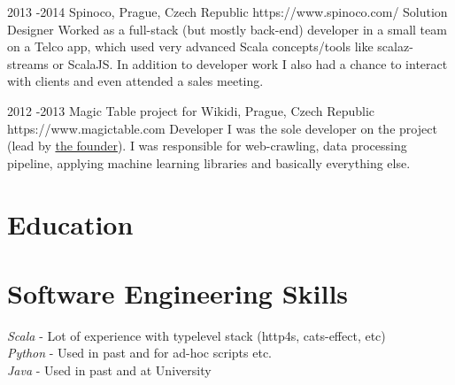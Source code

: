 \documentclass[10pt]{article} %
\begin{document}

\job
{2013 -}{2014 }
{Spinoco, Prague, Czech Republic}
{https://www.spinoco.com/}
{Solution Designer}
{Worked as a full-stack (but mostly back-end) developer in a small team on a Telco app, which used very advanced Scala concepts/tools like scalaz-streams or ScalaJS. In addition to developer work I also had a chance to interact with clients and even attended a sales meeting.\\
}


\job
{2012 -}{2013}
{Magic Table project for Wikidi, Prague, Czech Republic}
{https://www.magictable.com}
{Developer}
{I was the sole developer on the project (lead by \href{https://michal.illich.cz/}{the founder}). I was responsible for web-crawling, data processing pipeline, applying machine learning libraries and basically everything else. \\
}



\section{Education}



\section{Software Engineering Skills}

{
\textit{Scala} - Lot of experience with typelevel stack (http4s, cats-effect, etc)\\
\textit{Python} - Used in past and for ad-hoc scripts etc.\\
\textit{Java} - Used in past and at University\\
}
\end{document}
